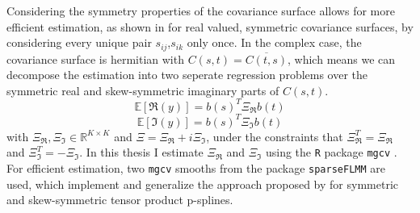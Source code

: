 Considering the symmetry properties of the covariance surface allows for more efficient estimation, as shown in \cite{CederbaumScheiplGreven2018} for real valued, symmetric covariance surfaces, by considering every unique pair $s_{ij}$,$s_{ik}$ only once.
In the complex case, the covariance surface is hermitian with $C(s,t) = \overline{C(t,s)}$, which means we can decompose the estimation into two seperate regression problems over the symmetric real and skew-symmetric imaginary parts of $C(s,t)$.
$$\mathbb{E}[\Re(y)] = b(s)^T \Xi_{\Re} b(t)$$
$$\mathbb{E}[\Im(y)] = b(s)^T \Xi_{\Im} b(t)$$
with $\Xi_\Re, \Xi_\Im \in \mathbb{R}^{K\times K}$ and $\Xi = \Xi_\Re + i \Xi_\Im$, under the constraints that $\Xi_\Re^T = \Xi_\Re$ and $\Xi_\Im^T = - \Xi_\Im$.
In this thesis I estimate $\Xi_\Re$ and $\Xi_\Im$ using the \texttt{R} \parencite{Rcore} package \texttt{mgcv} \parencite{Wood2017}.
For efficient estimation, two \texttt{mgcv} smooths from the package \texttt{sparseFLMM} \parencite{sparseFLMM} are used, which implement and generalize the approach proposed by \cite{CederbaumScheiplGreven2018} for symmetric and skew-symmetric tensor product p-splines.

